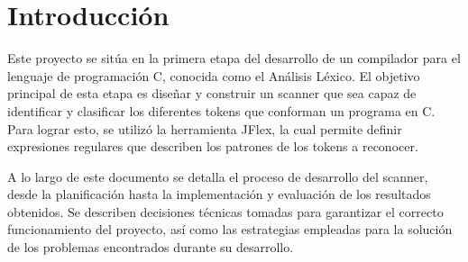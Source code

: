 \documentclass[a4paper,12pt]{article}
\begin{document}
\section*{Introducción}
\begin{flushleft}
	\hspace*{2em} Este proyecto se sitúa en la primera etapa del desarrollo
de un compilador para el lenguaje de programación C, conocida como el
Análisis Léxico. El objetivo principal de esta etapa es diseñar y construir
un scanner que sea capaz de identificar y clasificar los diferentes tokens
que conforman un programa en C. Para lograr esto, se utilizó la herramienta
JFlex, la cual permite definir expresiones regulares que describen los patrones
de los tokens a reconocer.\par
\vspace{1em}
\hspace*{2em} A lo largo de este documento se detalla el proceso de desarrollo 
del scanner, desde la planificación hasta la implementación y evaluación de los
resultados obtenidos. Se describen decisiones técnicas tomadas para garantizar el
correcto funcionamiento del proyecto, así como las estrategias empleadas para la 
solución de los problemas encontrados durante su desarrollo. 

\end{flushleft}

\end{document}
